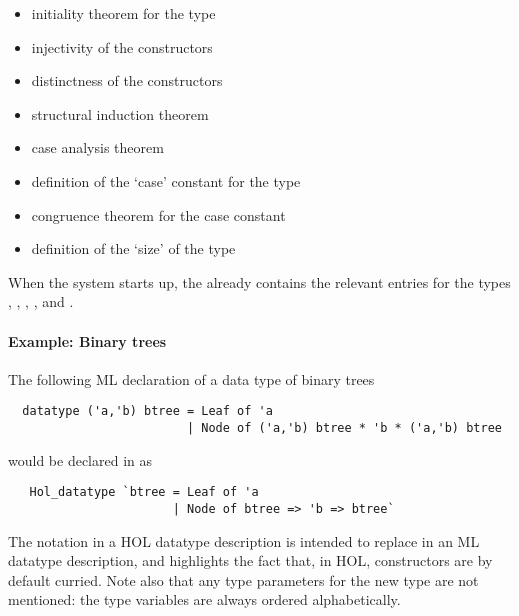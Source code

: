 \begin{itemize}
\item initiality theorem for the type
\item injectivity of the constructors
\item distinctness of the constructors
\item structural induction theorem
\item case analysis theorem
\item definition of the `case' constant for the type
\item congruence theorem for the case constant
\item definition of the `size' of the type
\end{itemize}

When the \HOL{} system
starts up, the  already contains the relevant entries for
the types , , , ,
and .

\paragraph{Example: Binary trees}
The following ML declaration of a data type of binary trees
\begin{hol}
\begin{verbatim}
  datatype ('a,'b) btree = Leaf of 'a
                         | Node of ('a,'b) btree * 'b * ('a,'b) btree
\end{verbatim}
\end{hol}
\noindent would be declared in \HOL{} as
\begin{hol}
\begin{verbatim}
   Hol_datatype `btree = Leaf of 'a
                       | Node of btree => 'b => btree`
\end{verbatim}
\end{hol}
\noindent The \holtxt{=>} notation in a HOL datatype description
is intended to replace \holtxt{*} in an ML datatype description,
and highlights the fact that, in HOL, constructors are by default
curried.  Note also that any type parameters for the new type are not
mentioned: the type variables are always ordered alphabetically.

